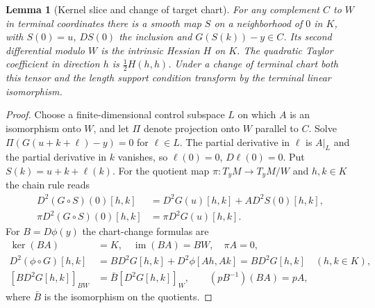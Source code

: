 \documentclass[11pt,letterpaper]{article}
\newtheorem{lemma}[theorem]{Lemma}
\newcommand{\im}{\operatorname{im}}
\begin{document}
\begin{lemma}[Kernel slice and change of target chart]\label{kernel-slice}
For any complement $C$ to $W$ in terminal coordinates there is a smooth
map $S$ on a neighborhood of $0$ in $K$, with $S(0)=u$, $DS(0)$ the
inclusion and $G(S(k))-y\in C$. Its second differential modulo $W$ is
the intrinsic Hessian $H$ on $K$. The quadratic Taylor coefficient in
direction $h$ is $\tfrac12 H(h,h)$. Under a change of terminal chart
both this tensor and the length support condition transform by the
terminal linear isomorphism.
\end{lemma}
\begin{proof}
Choose a finite-dimensional control subspace $L$ on which $A$ is an
isomorphism onto $W$, and let $\Pi$ denote projection onto $W$ parallel
to $C$. Solve $\Pi(G(u+k+\ell)-y)=0$ for $\ell\in L$.
The partial derivative in $\ell$ is $A|_L$ and the partial derivative
in $k$ vanishes, so $\ell(0)=0$, $D\ell(0)=0$. Put $S(k)=u+k+\ell(k)$.
For the quotient map $\pi:T_yM\to T_yM/W$ and $h,k\in K$ the chain rule reads
\begin{equation}\label{slice-hessian}
 \begin{aligned}
 D^2(G\circ S)(0)[h,k]&=D^2G(u)[h,k]+A D^2S(0)[h,k],\\
 \pi D^2(G\circ S)(0)[h,k]&=\pi D^2G(u)[h,k].
 \end{aligned}
\end{equation}
For $B=D\phi(y)$ the chart-change formulas are
\[
 \begin{aligned}
 \ker(BA)&=K,\quad \im(BA)=BW,\quad \pi A=0,\\
 D^2(\phi\circ G)[h,k]&=BD^2G[h,k]+D^2\phi[Ah,Ak]=BD^2G[h,k]
                       \quad(h,k\in K),\\
 [BD^2G[h,k]]_{BW}&=\bar B[D^2G[h,k]]_W,\qquad (pB^{-1})(BA)=pA ,
 \end{aligned}
\]
where $\bar B$ is the isomorphism on the quotients.
\end{proof}
\end{document}
